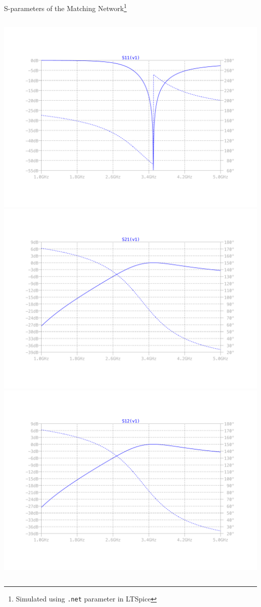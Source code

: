 \documentclass{beamer}
\begin{document}
\begin{frame}{S-parameters of the Matching Network\footnote{Simulated using \lstinline|.net| parameter in LTSpice}}
\begin{columns}
  \includegraphics[width=\linewidth]{images/matching_s_params/S11.pdf}
  \includegraphics[width=\linewidth]{images/matching_s_params/S21.pdf}
  \includegraphics[width=\linewidth]{images/matching_s_params/S12.pdf}

\end{columns}
\end{frame}
\end{document}
